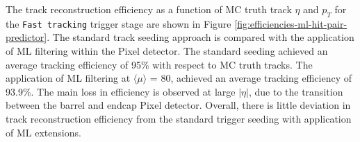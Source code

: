 The track reconstruction efficiency as a function of MC truth track $\eta$ and $p_T$ for the \texttt{Fast tracking} trigger stage are shown in Figure \ref{fig:efficiencies-ml-hit-pair-predictor}. The standard track seeding approach is compared with the application of ML filtering within the Pixel detector. The standard seeding achieved an average tracking efficiency of 95\% with respect to MC truth tracks. The application of ML filtering at $\langle \mu \rangle$ = 80, achieved an average tracking efficiency of 93.9\%. The main loss in efficiency is observed at large $\lvert \eta \rvert$, due to the transition between the barrel and endcap Pixel detector. Overall, there is little deviation in track reconstruction efficiency from the standard trigger seeding with application of ML extensions.



